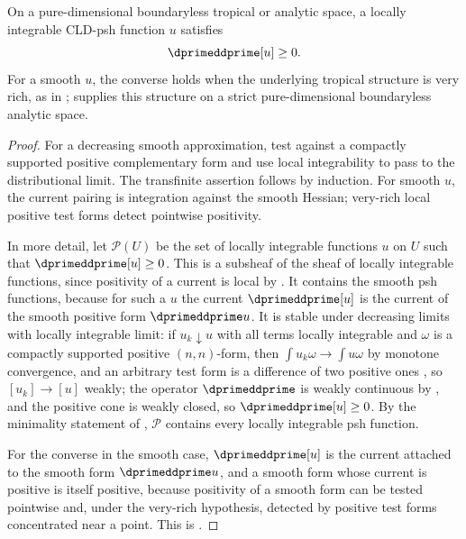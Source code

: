 \begin{proposition}\label{prop:cld-psh-positive-current}
On a pure-dimensional boundaryless tropical or analytic space, a locally
integrable CLD-psh function $u$ satisfies
\[
                          \dprimeddprime[u]\geq0.
\]
For a smooth $u$, the converse holds when the underlying tropical
structure is very rich, as in \cite[\S8.3]{CLD25};
\cite[Proposition~16.4.4]{CLD25} supplies this structure on a strict
pure-dimensional boundaryless analytic space.
\end{proposition}
\begin{proof}
For a decreasing smooth approximation, test against a compactly supported
positive complementary form and use local integrability to pass to the
distributional limit.  The transfinite assertion follows by induction.
For smooth $u$, the current pairing is integration against the smooth Hessian;
very-rich local positive test forms detect pointwise positivity.

In more detail, let $\mathscr P(U)$ be the set of locally integrable
functions $u$ on $U$ such that $\dprimeddprime[u]\ge0$.  This is a subsheaf
of the sheaf of locally integrable functions, since positivity of a current
is local by .  It contains the smooth
psh functions, because for such a $u$ the current $\dprimeddprime[u]$ is the
current of the smooth positive form $\dprimeddprime u$.  It is stable under
decreasing limits with locally integrable limit: if $u_k\downarrow u$ with
all terms locally integrable and $\omega$ is a compactly supported positive
$(n,n)$-form, then $\int u_k\omega\to\int u\omega$ by monotone convergence,
and an arbitrary test form is a difference of two positive ones
\cite[Proposition~6.5.2]{CLD25}, so $[u_k]\to[u]$ weakly; the operator
$\dprimeddprime$ is weakly continuous by
, and the positive cone is weakly
closed, so $\dprimeddprime[u]\ge0$.  By the minimality statement of
, $\mathscr P$ contains every locally
integrable psh function.

For the converse in the smooth case, $\dprimeddprime[u]$ is the current
attached to the smooth form $\dprimeddprime u$, and a smooth form whose
current is positive is itself positive, because positivity of a smooth form
can be tested pointwise and, under the very-rich hypothesis, detected by
positive test forms concentrated near a point.  This is \cite[Proposition~8.3.1]{CLD25}.
\end{proof}

